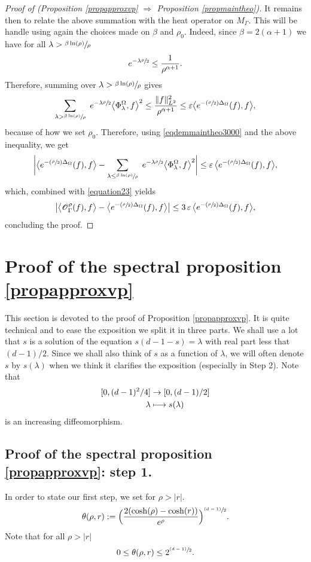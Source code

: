 \documentclass[JEP,XML,SOM,Unicode,NoFloatCountersInSection,published]{cedram}
\let\mathcal\mathscr
\let\epsilon\varepsilon
\newcommand{\Psfrac}[2]{(\sfrac{#1}{#2})}
\newcommand{\psfrac}[2]{\sfrac{(#1)}{#2}}
\def\mto{\mathchoice{\longmapsto}{\mapsto}{\mapsto}{\mapsto}}
\theoremstyle{plain}
\theoremstyle{definition}
\newcommand{\somme}[1]{\sum_{#1}}
\newcommand{\fonctionbis}[4]{\begin{split}
#1 & \to #2 \\
#3 & \mto #4
\end{split}}
\begin{document}
\begin{proof}[Proof of (Proposition \ref{propapproxvp}
$\Rightarrow$ Proposition \ref{propmaintheo})]
It remains then to relate the above summation with the heat operator on $M_\Gamma$. This will be handle using again the choices made on $\beta$ and $\rho_0$. Indeed, since $\beta = 2(\alpha +1)$ we have for all $\lambda > \sfrac{\beta \ln (\rho)}{\rho}$
\[
e^{-\lambda \sfrac{\rho}{2}} \le \frac{1}{\rho^{\alpha +1}}.
\]
Therefore, summing over $\lambda > \sfrac{\beta \ln (\rho)} {\rho}$ gives
\[
\somme{ \lambda > \sfrac{\beta \ln (\rho)} {\rho}} \ e^{-\lambda \sfrac{\rho}{2}} \bigl<\Phi^{\Omega}_{\lambda},f \bigr>^2 \le \frac{\|f\|_{L^2}^2}{\rho^{\alpha+1}} \le \epsilon \bigl< e^{- \Psfrac{\rho}{2} \Delta_{\Omega}}(f), f \bigr>,
\]
because of how we set $\rho_0$. Therefore, using \eqref{eqdemmaintheo3000} and the above inequality, we get
\[
\biggl| \bigl< e^{- \Psfrac{\rho}{2} \Delta_{\Omega}}(f), f \bigr> - \somme{ \lambda \le \sfrac{\beta \ln (\rho)} {\rho}} \ e^{-\lambda \sfrac{\rho}{2}} \bigl<\Phi^{\Omega}_{\lambda},f \bigr>^2 \biggr| \le \epsilon \,\bigl< e^{- \Psfrac{\rho}{2} \Delta_{\Omega}}(f), f \bigr>,
\]
which, combined with \eqref{equation23} yields
\[
\bigl| \bigl< \mathcal{O}_{\Gamma}^{\rho}(f),f \bigr> - \bigl< e^{- \Psfrac{\rho}{2} \Delta_{\Omega}}(f), f \bigr> \bigr| \le 3 \, \epsilon \, \bigl< e^{- \Psfrac{\rho}{2} \Delta_{\Omega}}(f), f \bigr>,
\]
concluding the proof.
\end{proof}

\section{Proof of the spectral proposition \ref{propapproxvp}}
\label{secetudevpselberg}

This section is devoted to the proof of Proposition \ref{propapproxvp}. It is quite technical and to ease the exposition we split it in three parts. We shall use a lot that $s$ is a solution of the equation $s(d-1-s) = \lambda$ with real part less that $(d-1)/2$. Since we shall also think of $s$ as a function of $\lambda$, we will often denote $s$ by $s(\lambda)$ when we think it clarifies the exposition (especially in Step 2). Note that
\[
\fonctionbis{[0, (d-1)^2/4 ]}{[0, (d -1)/2]}{\lambda}{s(\lambda)}
\]
is an increasing diffeomorphism.

\subsection{Proof of the spectral proposition \ref{propapproxvp}: step 1.} In order to state our first step, we set for $\rho > |r|$.
\[
\theta(\rho,r) := \Bigl(\frac{2(\cosh(\rho) - \cosh(r))}{e^{\rho}} \Bigr)^{\psfrac{d-1}{2}}.
\]
Note that for all $\rho > |r|$
\[
0 \le \theta(\rho,r) \le 2^{\psfrac{d-1}{2}}.
\]
\end{document}
